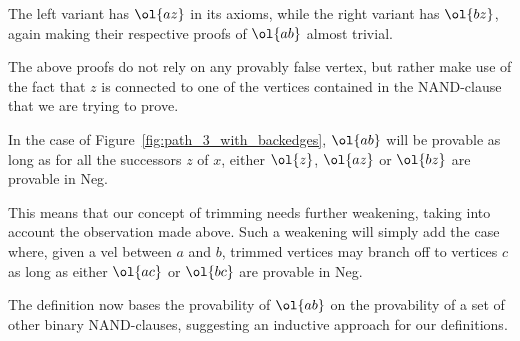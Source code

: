 The left variant has $\ol{az}$ in its axioms, while the right variant has $\ol{bz}$, again making their respective proofs of $\ol{ab}$ almost trivial.\par
\begin{figure}[!h]
  \centering
  \begin{prooftree}
  \end{prooftree}
  \hspace{5mm}
  \begin{prooftree}
  \end{prooftree}
  \caption{}
  \label{fig:proof_loop}
\end{figure}
\FloatBarrier
The above proofs do not rely on any provably false vertex, but rather make use of the fact that $z$ is connected to one of the vertices contained in the NAND-clause that we are trying to prove.

In the case of Figure~\ref{fig:path_3_with_backedges}, $\ol{ab}$ will be provable as long as for all the successors $z$ of $x$, either $\ol{z}$, $\ol{az}$ or $\ol{bz}$ are provable in Neg.

This means that our concept of trimming needs further weakening, taking into account the observation made above.
Such a weakening will simply add the case where, given a vel between $a$ and $b$, trimmed vertices may branch off to vertices $c$ as long as either $\ol{ac}$ or $\ol{bc}$ are provable in Neg.

The definition now bases the provability of $\ol{ab}$ on the provability of a set of other binary NAND-clauses, suggesting an inductive approach for our definitions.
